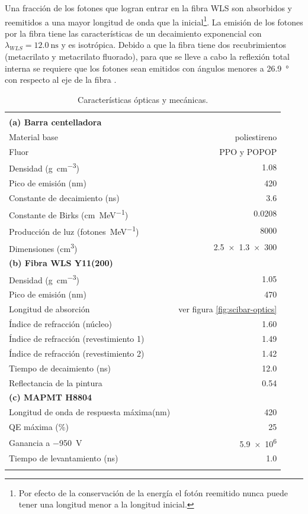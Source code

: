 Una fracción de los fotones que logran entrar en la fibra WLS son absorbidos y reemitidos a una mayor longitud de onda que la inicial\footnote{Por efecto de la conservación de la energía el fotón reemitido nunca puede tener una longitud menor a la longitud inicial.}. La emisión de los fotones por la fibra tiene las características de un decaimiento exponencial con $\lambda_{WLS}=\SI{12.0}{\nano\second}$ y es isotrópica. Debido a que la fibra tiene dos recubrimientos (metacrilato y metacrilato fluorado), para que se lleve a cabo la reflexión total interna se requiere que los fotones sean emitidos con ángulos menores a \SI{26.9}{\degree} con respecto al eje de la fibra \cite{kikawa14}.

\begin{table}
\caption{Características ópticas y mecánicas.}
\label{table:optics}

\begin{tabular}{lr}

\multicolumn{2}{c}{}\\
\cmidrule(r){1-2}
\addlinespace[5pt]
\textbf{(a) Barra centelladora}\\
\addlinespace[5pt]
\cmidrule(r){1-2}
Material base & poliestireno\\
Fluor & PPO y POPOP\\
Densidad (\si{\gram\per\cubic\cm}) & \num{1.08}\\
Pico de emisión (\si{\nm}) & \num{420}\\
Constante de decaimiento (\si{\ns}) & \num{3.6}\\
Constante de Birks (\si{\cm\per\mega\electronvolt}) & \num{0.0208}\\
Producción de luz (\si{fotones\per\mega\electronvolt}) & \num{8000}\\
Dimensiones (\si{\cubic\cm}) & \num[product-units=power]{2.5x1.3x300}\\
\addlinespace[10pt]
\textbf{(b) Fibra WLS Y11(200)}\\
\addlinespace[5pt]
\cmidrule(r){1-2}
Densidad (\si{\gram\per\cubic\cm}) & \num{1.05}\\
Pico de emisión (\si{\nm}) & \num{470}\\
Longitud de absorción & ver figura \ref{fig:scibar-optics}\\
Índice de refracción (núcleo) & \num{1.60}\\
Índice de refracción (revestimiento 1) & \num{1.49}\\
Índice de refracción (revestimiento 2) & \num{1.42}\\
Tiempo de decaimiento (\si{\ns}) & \num{12.0}\\
Reflectancia de la pintura & 0.54\\
\addlinespace[10pt]
\textbf{(c) MAPMT H8804}\\
\addlinespace[5pt]
\cmidrule(r){1-2}
Longitud de onda de respuesta máxima(\si{\nm}) & \num{420}\\
QE máxima (\si{\percent})  & \num{25}\\
Ganancia a \SI{-950}{\volt} & \num{5.9e6}\\
Tiempo de levantamiento (\si{\ns}) & \num{1.0}\\
\addlinespace[5pt]
\bottomrule


\end{tabular}
\end{table}
